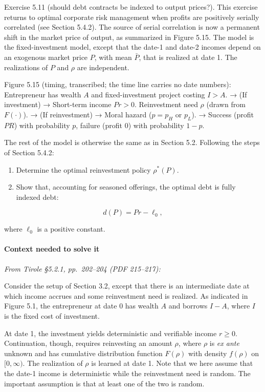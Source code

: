 \documentclass[11pt,a4paper]{article}
\begin{document}
Exercise 5.11 (should debt contracts be indexed to output prices?). This exercise returns to optimal
corporate risk management when profits are positively serially correlated (see Section 5.4.2). The
source of serial correlation is now a permanent shift in the market price of output, as summarized
in Figure 5.15. The model is the fixed-investment model, except that the date-1 and date-2 incomes
depend on an exogenous market price \(P\), with mean \(\bar P\), that is realized at date 1. The
realizations of \(P\) and \(\rho\) are independent.

Figure 5.15 (timing, transcribed; the time line carries no date numbers): Entrepreneur has wealth
\(A\) and fixed-investment project costing \(I > A\). → (If investment) → Short-term income
\(Pr > 0\). Reinvestment need \(\rho\) (drawn from \(F(\cdot)\)). → (If reinvestment) → Moral hazard
(\(p = p_H\) or \(p_L\)). → Success (profit \(PR\)) with probability \(p\), failure (profit 0) with
probability \(1-p\).

The rest of the model is otherwise the same as in Section 5.2. Following the steps of Section 5.4.2:

\begin{enumerate}
\def\labelenumi{(\roman{enumi})}
\item
  Determine the optimal reinvestment policy \(\rho^*(P)\).
\item
  Show that, accounting for seasoned offerings, the optimal debt is fully indexed debt:
\end{enumerate}

\[d(P) = Pr - \ell_0,\]

where \(\ell_0\) is a positive constant.

\paragraph{Context needed to solve it}

\emph{From Tirole §5.2.1, pp.~202--204 (PDF 215--217):}

Consider the setup of Section 3.2, except that there is an intermediate date at which income accrues
and some reinvestment need is realized. As indicated in Figure 5.1, the entrepreneur at date 0 has
wealth \(A\) and borrows \(I - A\), where \(I\) is the fixed cost of investment.

At date 1, the investment yields deterministic and verifiable income \(r \geqslant 0\).
Continuation, though, requires reinvesting an amount \(\rho\), where \(\rho\) is \emph{ex ante}
unknown and has cumulative distribution function \(F(\rho)\) with density \(f(\rho)\) on
\([0, \infty)\). The realization of \(\rho\) is learned at date 1. Note that we here assume that the
date-1 income is deterministic while the reinvestment need is random. The important assumption is
that at least one of the two is random.
\end{document}
